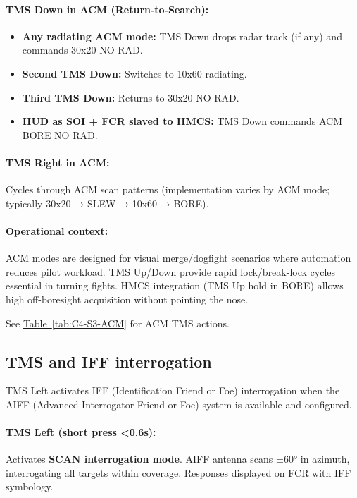 \documentclass[11pt, a4paper, twoside]{report}
\newcommand{\tabref}[1]{\hyperref[#1]{Table~\ref*{#1}}}
\begin{document}
\paragraph{TMS Down in ACM (Return-to-Search):}
\begin{itemize}
    \item \textbf{Any radiating ACM mode:} TMS Down drops radar track (if any) and commands 30x20 NO RAD.
    \item \textbf{Second TMS Down:} Switches to 10x60 radiating.
    \item \textbf{Third TMS Down:} Returns to 30x20 NO RAD.
    \item \textbf{HUD as SOI + FCR slaved to HMCS:} TMS Down commands ACM BORE NO RAD.
\end{itemize}

\paragraph{TMS Right in ACM:}
Cycles through ACM scan patterns (implementation varies by ACM mode; typically 30x20 → SLEW → 10x60 → BORE).

\paragraph{Operational context:}
ACM modes are designed for visual merge/dogfight scenarios where automation reduces pilot workload. TMS Up/Down provide rapid lock/break-lock cycles essential in turning fights. HMCS integration (TMS Up hold in BORE) allows high off-boresight acquisition without pointing the nose.

See \tabref{tab:C4-S3-ACM} for ACM TMS actions.

\subsection{TMS and IFF interrogation}
\label{sec:C4-S3-S5}

TMS Left activates IFF (Identification Friend or Foe) interrogation when the AIFF (Advanced Interrogator Friend or Foe) system is available and configured.

\paragraph{TMS Left (short press <0.6s):}
Activates \textbf{SCAN interrogation mode}. AIFF antenna scans ±60° in azimuth, interrogating all targets within coverage. Responses displayed on FCR with IFF symbology.
\end{document}
